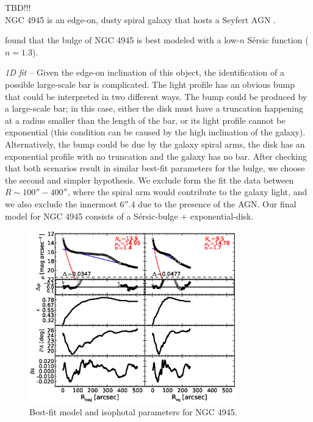\documentclass[preprint2]{emulateapj}
\newcommand{\fitfigurewidth}{0.8\textwidth}
\begin{document}
  TBD!!! \\
  NGC 4945 is an edge-on, dusty spiral galaxy that hosts a Seyfert AGN \citep{lin2011}.

  \cite{kormendy2010} found that the bulge of NGC 4945 is best modeled with a low-$n$ S\'ersic function
  ($n = 1.3$).

  \emph{1D fit -- }
  Given the edge-on inclination of this object, the identification of a possible large-scale bar is complicated.
  The light profile has an obvious bump that could be interpreted in two different ways.
  The bump could be produced by a large-scale bar; 
  in this case, either the disk must have a truncation happening at a radius smaller than the length of the bar,
  or its light profile cannot be exponential (this condition can be caused by the high inclination of the galaxy).
  Alternatively, the bump could be due by the galaxy spiral arms, the disk has an exponential profile with no truncation
  and the galaxy has no bar.
  After checking that both scenarios result in similar best-fit parameters for the bulge, 
  we choose the second and simpler hypothesis.
  We exclude form the fit the data between $R \sim 100''-400''$, where the spiral arm would contribute to the galaxy light,
  and we also exclude the innermost $6''.4$ due to the presence of the AGN.
  Our final model for NGC 4945 consists of a S\'ersic-bulge + exponential-disk.

  \begin{figure}[h]
  \begin{center}
  \includegraphics[width=\fitfigurewidth]{images/n4945_1Dfit.eps}
  \caption{Best-fit model and isophotal parameters for NGC 4945.}
  \end{center}
  \end{figure}
\end{document}
